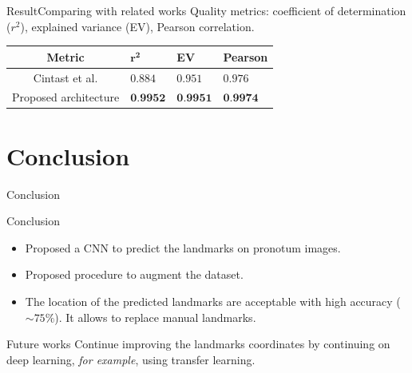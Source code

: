 \documentclass[10pt]{beamer}
\begin{document}
\begin{frame}{Result}{Comparing with related works}
\small{Quality metrics: coefficient of determination ($r^2$), explained variance (EV), Pearson correlation.
	}
	\begin{table}[htbp]
\centering
\begin{center}
\begin{tabular}{|c|p{1cm}|p{1cm}|p{1.5cm}|}
\hline
Metric & $\mathbf{r^{2}}$ & \textbf{EV} & \textbf{Pearson} \\ \hline
Cintast et al. \cite{cintas2016automatic} & $0.884$ & $0.951$ & $0.976$ \\ \hline
Proposed architecture & $\textbf{0.9952}$ & $\textbf{0.9951}$ & $\textbf{0.9974}$ \\ \hline
\end{tabular}
\label{tab3}
\end{center}
\end{table}
\end{frame}
\section{Conclusion}
\begin{frame}{Conclusion}
	\begin{block}{Conclusion}
		\small{
			\begin{itemize}
				\item Proposed a CNN to predict the landmarks on pronotum images.
				\item Proposed procedure to augment the dataset.
				\item The location of the predicted landmarks are acceptable with high accuracy ($ \sim75\%$). It allows to replace manual landmarks.
			\end{itemize}
		}
	\end{block}
	\pause
	\begin{block}{Future works}
		\small{Continue improving the landmarks coordinates by continuing on deep learning, \textit{for example}, using transfer learning.}
	\end{block}
\end{frame}

{\1
\begin{frame}
\end{frame}}
\end{document}
